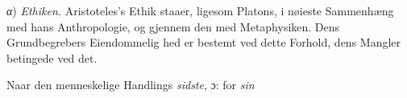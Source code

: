 \documentclass[12pt,a4paper]{book}
\newcommand{\gk}[1]{\textit{#1}}
\begin{document}
\gk{α}) \emph{Ethiken.} Aristoteles's Ethik staaer, ligesom Platons,
i nøieste Sammenhæng med hans Anthropologie, og gjennem
den med Metaphysiken. Dens Grundbegrebers Eiendommelig\-%
hed er bestemt ved dette Forhold, dens Mangler betingede
ved det.

Naar den menneskelige Handlings \emph{sidste}, ɔ: for \emph{sin}
%
\end{document}
